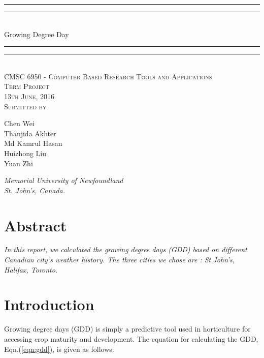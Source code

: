 \documentclass{article}
\begin{document}
{\centering

\rule{\textwidth}{1.6pt}\vspace*{-\baselineskip}\vspace*{2pt} 
\rule{\textwidth}{0.4pt}\\[\baselineskip] 
{\LARGE Growing Degree Day}
\rule{\textwidth}{0.4pt}\vspace*{-\baselineskip}\vspace{3.2pt}
\rule{\textwidth}{1.6pt}\\[\baselineskip] 

\vspace{20mm} %
\scshape %
CMSC 6950 - Computer Based Research Tools and Applications \\ [\baselineskip]
Term Project \\[\baselineskip] 
13th June, 2016 \\[\baselineskip] 
\vspace{20mm} %
Submitted by \\[\baselineskip]
{\Large Chen Wei \\Thanjida Akhter \\ Md Kamrul Hasan \\ Huizhong Liu \\ Yuan Zhi \par}
\vfill
{\itshape Memorial University of Newfoundland \\ St. John's, Canada.\par} 
}

\newpage

{\centering
  \section*{Abstract}
}

{\itshape In this report, we calculated the growing degree days (GDD) based on different Canadian city's weather history.  The three cities we chose are : St.John's, Halifax, Toronto. \\
}





\section{ \bf Introduction}
Growing degree days (GDD) is simply a predictive tool used in horticulture for accessing crop maturity and development. The equation for calculating the GDD, Eqn.(\ref{eqn:gdd}), is given as follows:
\end{document}
